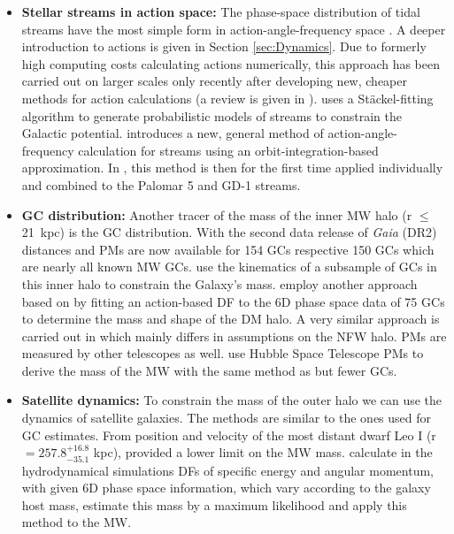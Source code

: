 \begin{itemize}
    \item \textbf{Stellar streams in action space:} The phase-space distribution of tidal streams have the most simple form in action-angle-frequency space \citep{Tremaine...streamsactiontheory...1999, Helmi...streamsactionstheory...1999}. A deeper introduction to actions is given in Section \ref{sec:Dynamics}. Due to formerly high computing costs calculating actions numerically, this approach has been carried out on larger scales only recently after developing new, cheaper methods for action calculations (a review is given in \citealp{Sanders...actionreview...2016}). \citet{Streams...Sanders...2014} uses a St\"ackel-fitting algorithm \citep{Sanders...Staeckel...2012} to generate probabilistic models of streams to constrain the Galactic potential. \citet{Streams...Bovy...2014} introduces a new, general method of action-angle-frequency calculation for streams using an orbit-integration-based approximation. In \citet{Streams..GD1..Pal5...Bovy...2016}, this method is then for the first time applied individually and combined to the Palomar 5 and GD-1 streams.
    \item \textbf{\ac{GC} distribution:} Another tracer of the mass of the inner \ac{MW} halo (r $\le$ \SI{21}{kpc}) is the \ac{GC} distribution. With the second data release of \textit{Gaia} (DR2) distances and \acp{PM} are now available for 154 \acp{GC} \citep{Baumgardt...GCoverview...2019} respective 150 \acp{GC} \citep{Vasiliev...GCoverview...2018} which are nearly all known \ac{MW} \acp{GC}. 
    \citet{MWmass...GCmotions...Watkins...2018} use the kinematics of a subsample of \acp{GC} in this inner halo to constrain the Galaxy's mass. \citet{Posti...MWmassGCs...2018} employ another approach based on \citet{Binney...MWGCModel....2017} by fitting an action-based \ac{DF} to the 6D phase space data of 75 \acp{GC} to determine the mass and shape of the \ac{DM} halo. A very similar approach is carried out in \citet{Vasiliev...GCoverview...2018} which mainly differs in assumptions on the \ac{NFW} halo. \acp{PM} are measured by other telescopes as well. \citet{Sohn...GCsHST..2018} use Hubble Space Telescope \acp{PM} to derive the mass of the \ac{MW} with the same method as \citet{MWmass...GCmotions...Watkins...2018} but fewer \acp{GC}. 

    \item \textbf{Satellite dynamics:} To constrain the mass of the outer halo we can use the dynamics of satellite galaxies. The methods are similar to the ones used for \ac{GC} estimates. From position and velocity of the most distant dwarf Leo I (r $= 257.8_{{-35.1}}^{+16.8} $ kpc), \citet{GaiaDR...GCs...2018} provided a lower limit on the \ac{MW} mass. \citet{MWmass...sat...dyn} calculate in the hydrodynamical simulations \acp{DF} of specific energy and angular momentum, with given 6D phase space information, which vary according to the galaxy host mass, estimate this mass by a maximum likelihood and apply this method to the \ac{MW}.
\end{itemize}

